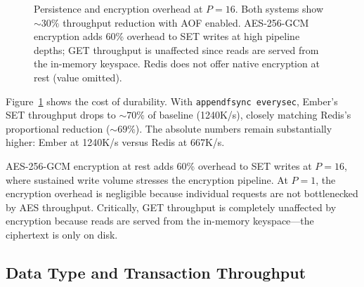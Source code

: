 \documentclass[conference]{IEEEtran}
\begin{document}
\begin{figure}[t]
\centering
{}
\caption{Persistence and encryption overhead at $P{=}16$. Both
systems show ${\sim}30\%$ throughput reduction with AOF enabled.
AES-256-GCM encryption adds 60\% overhead to SET writes at high
pipeline depths; GET throughput is unaffected since reads are served
from the in-memory keyspace. Redis does not offer native encryption
at rest (value omitted).}
\label{fig:persistence}
\end{figure}

Figure~\ref{fig:persistence} shows the cost of durability.
With \texttt{appendfsync everysec}, Ember's SET throughput drops to
${\sim}70\%$ of baseline (\num{1240}K/s), closely matching Redis's
proportional reduction (${\sim}69\%$). The absolute numbers remain
substantially higher: Ember at \num{1240}K/s versus Redis at
\num{667}K/s.

AES-256-GCM encryption at rest adds 60\% overhead to SET writes at
$P{=}16$, where sustained write volume stresses the encryption
pipeline. At $P{=}1$, the encryption overhead is negligible because
individual requests are not bottlenecked by AES throughput. Critically,
GET throughput is completely unaffected by encryption because reads
are served from the in-memory keyspace---the ciphertext is only on
disk.


\subsection{Data Type and Transaction Throughput}
\end{document}
